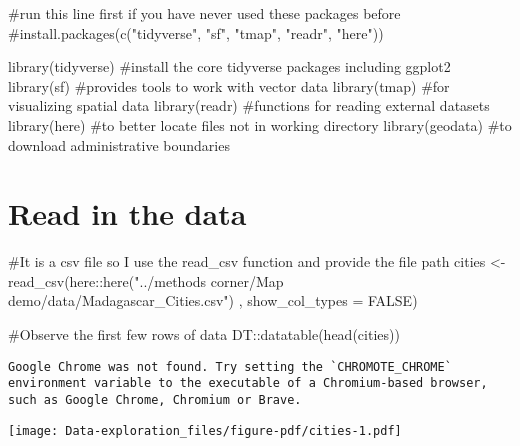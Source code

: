 \documentclass[
  letterpaper,
  DIV=11,
  numbers=noendperiod]{scrreprt}
\newenvironment{Shaded}{\begin{snugshade}}{\end{snugshade}}
\newcommand{\AttributeTok}[1]{\textcolor[rgb]{0.40,0.45,0.13}{#1}}
\newcommand{\CommentTok}[1]{\textcolor[rgb]{0.37,0.37,0.37}{#1}}
\newcommand{\ConstantTok}[1]{\textcolor[rgb]{0.56,0.35,0.01}{#1}}
\newcommand{\FunctionTok}[1]{\textcolor[rgb]{0.28,0.35,0.67}{#1}}
\newcommand{\NormalTok}[1]{\textcolor[rgb]{0.00,0.23,0.31}{#1}}
\newcommand{\OtherTok}[1]{\textcolor[rgb]{0.00,0.23,0.31}{#1}}
\newcommand{\SpecialCharTok}[1]{\textcolor[rgb]{0.37,0.37,0.37}{#1}}
\newcommand{\StringTok}[1]{\textcolor[rgb]{0.13,0.47,0.30}{#1}}
\begin{document}
\begin{Shaded}
\begin{Highlighting}[]
\CommentTok{\#run this line first if you have never used these packages before}
\CommentTok{\#install.packages(c("tidyverse", "sf", "tmap", "readr", "here"))}

\FunctionTok{library}\NormalTok{(tidyverse) }\CommentTok{\#install the core tidyverse packages including ggplot2}
\FunctionTok{library}\NormalTok{(sf) }\CommentTok{\#provides tools to work with vector data }
\FunctionTok{library}\NormalTok{(tmap) }\CommentTok{\#for visualizing spatial data}
\FunctionTok{library}\NormalTok{(readr) }\CommentTok{\#functions for reading external datasets }
\FunctionTok{library}\NormalTok{(here) }\CommentTok{\#to better locate files not in working directory}
\FunctionTok{library}\NormalTok{(geodata) }\CommentTok{\#to download administrative boundaries}
\end{Highlighting}
\end{Shaded}

\section{Read in the data}\label{read-in-the-data}

\begin{Shaded}
\begin{Highlighting}[]
\CommentTok{\#It is a csv file so I use the read\_csv function and provide the file path}
\NormalTok{cities }\OtherTok{\textless{}{-}} \FunctionTok{read\_csv}\NormalTok{(here}\SpecialCharTok{::}\FunctionTok{here}\NormalTok{(}\StringTok{"../methods corner/Map demo/data/Madagascar\_Cities.csv"}\NormalTok{)}
\NormalTok{                   , }\AttributeTok{show\_col\_types =} \ConstantTok{FALSE}\NormalTok{)}

\CommentTok{\#Observe the first few rows of data}
\NormalTok{DT}\SpecialCharTok{::}\FunctionTok{datatable}\NormalTok{(}\FunctionTok{head}\NormalTok{(cities))}
\end{Highlighting}
\end{Shaded}

\begin{verbatim}
Google Chrome was not found. Try setting the `CHROMOTE_CHROME` environment variable to the executable of a Chromium-based browser, such as Google Chrome, Chromium or Brave.
\end{verbatim}

\texttt{[image: Data-exploration\_files/figure-pdf/cities-1.pdf]}
\end{document}
